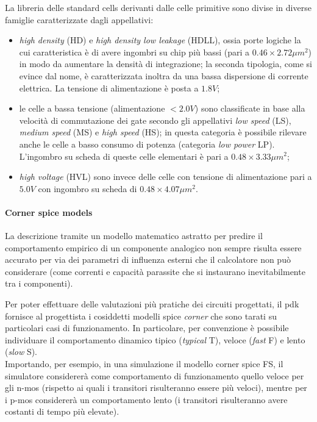 		La libreria delle standard cells derivanti dalle celle primitive sono divise in diverse famiglie caratterizzate dagli appellativi:
		\begin{itemize}
			\item \textit{high density} (HD) e \textit{high density low leakage} (HDLL), ossia porte logiche la cui caratteristica è di avere ingombri su chip più bassi (pari a $0.46\times 2.72 \mu m^2$) in modo da aumentare la densità di integrazione; la seconda tipologia, come si evince dal nome, è caratterizzata inoltra da una bassa dispersione di corrente elettrica. La tensione di alimentazione è posta a $1.8V$;
			\item le celle a bassa tensione (alimentazione $<2.0V$) sono classificate in base alla velocità di commutazione dei gate secondo gli appellativi \textit{low speed} (LS), \textit{medium speed} (MS) e \textit{high speed} (HS); in questa categoria è possibile rilevare anche le celle a basso consumo di potenza (categoria \textit{low power} LP). L'ingombro su scheda di queste celle elementari è pari a $0.48\times 3.33\mu m^2$;
			\item \textit{high voltage} (HVL) sono invece delle celle con tensione di alimentazione pari a $5.0V$ con ingombro su scheda di $0.48\times 4.07 \mu m^2$.
		\end{itemize}
	
		\paragraph{Corner spice models} La descrizione tramite un modello matematico astratto per predire il comportamento empirico di un componente analogico non sempre risulta essere accurato per via dei parametri di influenza esterni che il calcolatore non può considerare (come correnti e capacità parassite che si instaurano inevitabilmente tra i componenti).
		
		Per poter effettuare delle valutazioni più pratiche dei circuiti progettati, il pdk fornisce al progettista i cosiddetti modelli spice \textit{corner} che sono tarati su particolari casi di funzionamento. In particolare, per convenzione è possibile individuare il comportamento dinamico tipico (\textit{typical} T), veloce (\textit{fast} F) e lento (\textit{slow} S).\\
		Importando, per esempio, in una simulazione il modello corner spice FS, il simulatore considererà come comportamento di funzionamento quello veloce per gli n-mos (rispetto ai quali i transitori risulteranno essere più veloci), mentre per i p-mos considererà un comportamento lento (i transitori risulteranno avere costanti di tempo più elevate).
		
